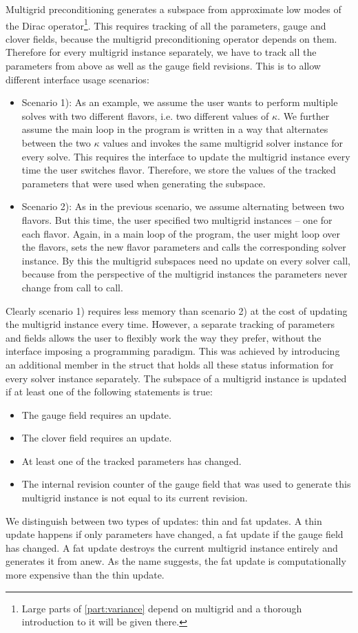 Multigrid preconditioning generates a subspace from approximate low modes of the Dirac operator\footnote{Large parts of \cref{part:variance} depend on multigrid and a thorough introduction to it will be given there.}.
This requires tracking of all the parameters, gauge and clover fields, because the multigrid preconditioning operator depends on them.
Therefore for every multigrid instance separately, we have to track all the parameters from above as well as the gauge field revisions.
This is to allow different interface usage scenarios:
\begin{itemize}
  \item Scenario 1): As an example, we assume the user wants to perform multiple solves with two different flavors, i.e. two different values of $\kappa$. We further assume the main loop in the program is written in a way that alternates between the two $\kappa$ values and invokes the same multigrid solver instance for every solve. This requires the interface to update the multigrid instance every time the user switches flavor. Therefore, we store the values of the tracked parameters that were used when generating the subspace.
  \item Scenario 2): As in the previous scenario, we assume alternating between two flavors. But this time, the user specified two multigrid instances -- one for each flavor. Again, in a main loop of the program, the user might loop over the flavors, sets the new flavor parameters and calls the corresponding solver instance. By this the multigrid subspaces need no update on every solver call, because from the perspective of the multigrid instances the parameters never change from call to call.
\end{itemize}
Clearly scenario 1) requires less memory than scenario 2) at the cost of updating the multigrid instance every time. However, a separate tracking of parameters and fields allows the user to flexibly work the way they prefer, without the interface imposing a programming paradigm.
This was achieved by introducing an additional member in the  struct that holds all these status information for every solver instance separately.
The subspace of a multigrid instance is updated if at least one of the following statements is true:
\begin{itemize}
  \item The gauge field requires an update.
  \item The clover field requires an update.
  \item At least one of the tracked parameters has changed.
  \item The internal revision counter of the gauge field that was used to generate this multigrid instance is not equal to its current revision.
\end{itemize}
We distinguish between two types of updates: thin and fat updates.
A thin update happens if only parameters have changed, a fat update if the gauge field has changed.
A fat update destroys the current multigrid instance entirely and generates it from anew.
As the name suggests, the fat update is computationally more expensive than the thin update.

